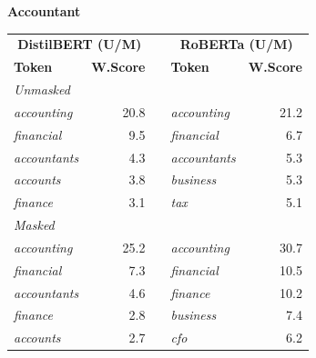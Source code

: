 \documentclass[11pt]{article}
\begin{document}
\vspace{4pt}\noindent\textbf{Accountant}
\begin{center}\scriptsize
\begin{tabular}{lrllr}
\toprule
\multicolumn{2}{c}{\textbf{DistilBERT (U/M)}} & & \multicolumn{2}{c}{\textbf{RoBERTa (U/M)}} \\
\textbf{Token} & \textbf{W.Score} & & \textbf{Token} & \textbf{W.Score} \\
\midrule
\multicolumn{5}{l}{\textit{Unmasked}} \\
\emph{accounting} & 20.8 & & \emph{accounting} & 21.2 \\
\emph{financial} & 9.5 & & \emph{financial} & 6.7 \\
\emph{accountants} & 4.3 & & \emph{accountants} & 5.3 \\
\emph{accounts} & 3.8 & & \emph{business} & 5.3 \\
\emph{finance} & 3.1 & & \emph{tax} & 5.1 \\
\multicolumn{5}{l}{\textit{Masked}} \\
\emph{accounting} & 25.2 & & \emph{accounting} & 30.7 \\
\emph{financial} & 7.3 & & \emph{financial} & 10.5 \\
\emph{accountants} & 4.6 & & \emph{finance} & 10.2 \\
\emph{finance} & 2.8 & & \emph{business} & 7.4 \\
\emph{accounts} & 2.7 & & \emph{cfo} & 6.2 \\
\bottomrule
\end{tabular}
\end{center}
\end{document}

